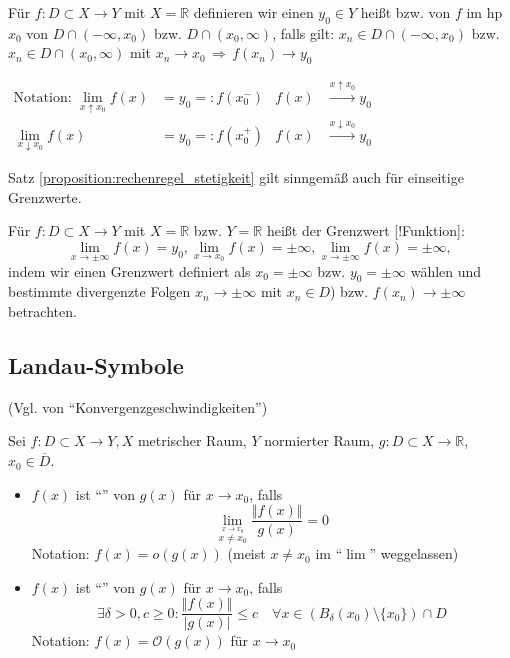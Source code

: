 \begin{definition}
	Für $f:D\subset X\to Y$ mit $X=\mathbb{R}$ definieren wir einen  $y_0\in Y$ heißt  bzw.  von $f$ im \gls{hp} $x_0$ von $D\cap(-\infty, x_0)$ bzw. $D\cap(x_0,\infty)$, falls gilt: $x_n\in D\cap(-\infty, x_0)$ bzw. $x_n\in D\cap (x_0,\infty)$ mit $x_n\to x_0\,\Rightarrow \,f(x_n)\to y_0$
	
	$\begin{aligned}
		\text{Notation: } \lim\limits_{x\uparrow x_0} f(x) &= y_0 =: f(x_0^-)& f(x)&\overset{x\uparrow x_0}{\longrightarrow} y_0 \\
		\lim\limits_{x\downarrow x_0}f(x) &= y_0 =:f(x_0^+) & f(x) &\overset{x\downarrow x_0}{\longrightarrow} y_0
	\end{aligned}$
\end{definition}

\begin{remark}
	Satz \ref{proposition:rechenregel_stetigkeit} gilt sinngemäß auch für einseitige Grenzwerte.
	
	Für $f:D\subset X\to Y$ mit $X=\mathbb{R}$ bzw. $Y=\mathbb{R}$ heißt der Grenzwert [!Funktion]: \[\lim\limits_{x\to \pm \infty} f(x) = y_0, \lim\limits_{x\rightarrow x_0} f(x) = \pm \infty, \lim\limits_{x\to \pm \infty} f(x) = \pm \infty,\] indem wir einen Grenzwert definiert als $x_0=\pm \infty$ bzw. $y_0=\pm\infty$ wählen und bestimmte divergenzte Folgen $x_n\to \pm \infty$ mit $x_n\in D$) bzw. $f(x_n)\to \pm \infty$ betrachten.
\end{remark}
\subsection*{Landau-Symbole} (Vgl. von "`Konvergenzgeschwindigkeiten"')
\begin{definition}
	Sei $f:D\subset X\to Y, X$ metrischer Raum, $Y$ normierter Raum, $g:D\subset X\to \mathbb{R}$, $x_0\in \overline{D}$.
	\begin{itemize}
		\item $f(x)$ ist "`"' von $g(x)$ für $x\to x_0$, falls \[ \lim\limits_{\stackrel{x\to x_0}{x\neq x_0}} \frac{\Vert f(x)\Vert}{g(x)} = 0 \]
		Notation: $f(x) = o(g(x))$ (meist $x\neq x_0$ im "`$\lim$"' weggelassen)
		\item $f(x)$ ist "`"' von $g(x)$ für $x\to x_0$, falls \[ \exists \delta > 0, c \ge 0: \frac{\Vert f(x)\Vert}{|g(x)|} \le c \quad \forall x\in (B_\delta(x_0) \setminus \{x_0\})\cap D \]
		Notation: $f(x) = \mathcal{O}(g(x))$ für $x\to x_0$
	\end{itemize}
\end{definition}

